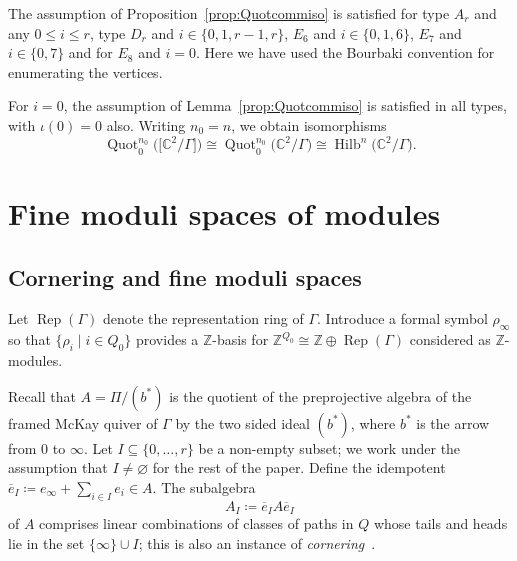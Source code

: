 \documentclass[pdftex]{sigma}%
\newcommand{\SC}{\mathbb{C}} %
\newcommand{\Rep}{\operatorname{Rep}}
\newcommand{\PiQ}{A}
\DeclareMathOperator{\Hilb}{\mathrm{Hilb}}
\DeclareMathOperator{\Quot}{\mathrm{Quot}}
\numberwithin{equation}{section}
\begin{document}
\begin{Remark}
The assumption of Proposition~\ref{prop:Quotcommiso} is satisfied for type $A_r$ and any $0 \leq i \leq r$, type $D_r$ and $i \in \{0,1,r-1,r\}$, $E_6$ and $i \in \{0,1,6\}$, $E_7$ and $i \in \{0,7\}$ and for $E_8$ and $i=0$. Here we have used the Bourbaki convention \cite{BourbakiLie} for enumerating the vertices.
\end{Remark}

\begin{Example}
\label{rem:crsstck}
For $i=0$, the assumption of Lemma~\ref{prop:Quotcommiso} is satisfied in all types, with $\iota(0)=0$ also. Writing $n_0=n$, we obtain isomorphisms
\[ \Quot_0^{n_0}\big(\big[\SC^2/\Gamma\big]\big)\cong \Quot_0^{n_0}\big(\SC^2/\Gamma\big)\cong \Hilb^{n}\big(\SC^2/\Gamma\big). \]
\end{Example}

\section{Fine moduli spaces of modules}
\label{subsec:finemod}

\subsection{Cornering and fine moduli spaces}

Let $\Rep(\Gamma)$
denote the representation ring of $\Gamma$. Introduce a formal symbol $\rho_{\infty}$ so that $\{\rho_i \mid i \in Q_0\}$ provides a $\mathbb{Z}$-basis for $\mathbb{Z}^{Q_0}\cong \mathbb{Z}\oplus \Rep(\Gamma)$ considered as $\mathbb{Z}$-modules.

Recall that $\PiQ=\Pi/(b^{\ast})$ is the quotient of the
preprojective algebra of the framed McKay quiver of $\Gamma$ by the two sided ideal $(b^{\ast})$, where $b^\ast$ is the arrow from $0$ to $\infty$.
Let $I \subseteq \{0, \dots , r\}$ be a non-empty subset; we work under the assumption that $I\ne \varnothing$ for the rest of the paper.
Define the idempotent $\overline{e}_I \coloneqq e_{\infty} + \sum_{i \in I} e_i \in \PiQ$.
The subalgebra
\begin{equation}\label{eqn:AI}
\PiQ_I \coloneqq \overline{e}_I \PiQ \overline{e}_I
\end{equation}
of $A$ comprises linear combinations of
classes of paths in $Q$ whose tails and heads lie in the set $\{\infty\} \cup I$; this is also an instance of \emph{cornering}~\cite[Remark~3.1]{craw2018multigraded}.
\end{document}
